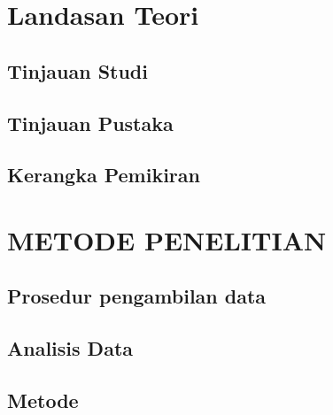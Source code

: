 \documentclass[a4paper,12pt]{report}
\begin{document}
\chapter{Landasan Teori}
\section{Tinjauan Studi}
\section{Tinjauan Pustaka}
\section{Kerangka Pemikiran}

\chapter{METODE PENELITIAN}
\section{Prosedur pengambilan data}
\section{Analisis Data}
\section{Metode}

\printbibliography
\end{document}
